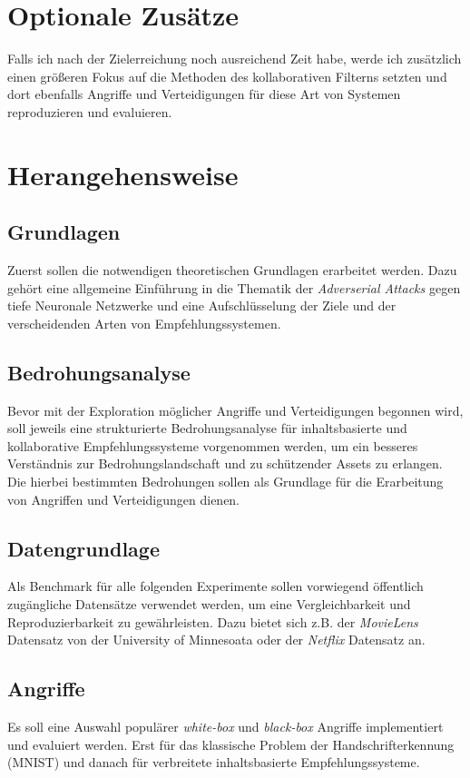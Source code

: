 \documentclass{scrartcl}
\begin{document}
	
	\section{Optionale Zusätze}
	Falls ich nach der Zielerreichung noch ausreichend Zeit habe, werde ich zusätzlich einen größeren Fokus auf die Methoden des kollaborativen Filterns setzten und dort ebenfalls Angriffe und Verteidigungen für diese Art von Systemen reproduzieren und evaluieren.
	
	\section{Herangehensweise}
		\subsection{Grundlagen}
		Zuerst sollen die notwendigen theoretischen Grundlagen erarbeitet werden. Dazu gehört eine allgemeine Einführung in die Thematik der \textit{Adverserial Attacks} gegen tiefe Neuronale Netzwerke und eine Aufschlüsselung der Ziele und der verscheidenden Arten von Empfehlungssystemen.
		\subsection{Bedrohungsanalyse}
		Bevor mit der Exploration möglicher Angriffe und Verteidigungen begonnen wird, soll jeweils eine strukturierte Bedrohungsanalyse für inhaltsbasierte und kollaborative Empfehlungssysteme vorgenommen werden, um ein besseres Verständnis zur Bedrohungslandschaft und zu schützender Assets zu erlangen. Die hierbei bestimmten Bedrohungen sollen als Grundlage für die Erarbeitung von Angriffen und Verteidigungen dienen. 

		\subsection{Datengrundlage}
		Als Benchmark für alle folgenden Experimente sollen vorwiegend öffentlich zugängliche Datensätze verwendet werden, um eine Vergleichbarkeit und Reproduzierbarkeit zu gewährleisten. Dazu bietet sich z.B. der \textit{MovieLens} Datensatz von der University of Minnesoata \cite{harper2015movielens} oder der \textit{Netflix} Datensatz \cite{bennett2007netflix} an.
		\subsection{Angriffe}
			Es soll eine Auswahl populärer \textit{white-box} und \textit{black-box} Angriffe implementiert und evaluiert werden. Erst für das klassische Problem der Handschrifterkennung (MNIST) \cite{lecun2010mnist} und danach für verbreitete inhaltsbasierte Empfehlungssysteme.
			
\end{document}
